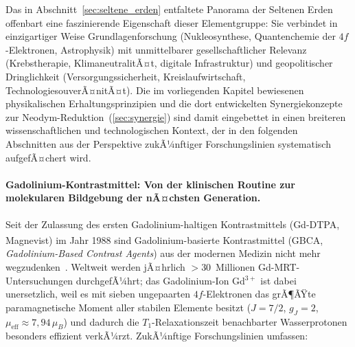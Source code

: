 ﻿\documentclass[12pt, a4paper]{report}
\theoremstyle{definition}
\theoremstyle{remark}
\begin{document}
Das in Abschnitt~\ref{sec:seltene_erden} entfaltete Panorama der Seltenen
Erden offenbart eine faszinierende Eigenschaft dieser Elementgruppe: Sie
verbindet in einzigartiger Weise Grundlagenforschung (Nukleosynthese,
Quantenchemie der $4f$-Elektronen, Astrophysik) mit unmittelbarer gesellschaft\-licher
Relevanz (Krebstherapie, KlimaneutralitÃ¤t, digitale Infrastruktur) und
geopolitischer Dringlichkeit (Versorgungssicherheit, Kreislaufwirtschaft,
TechnologiesouverÃ¤nitÃ¤t). Die im vorliegenden Kapitel bewiesenen
physikalischen Erhaltungsprinzipien und die dort entwickelten
Synergiekonzepte zur Neodym-Reduktion~(\ref{sec:synergie}) sind damit
eingebettet in einen breiteren wissenschaftlichen und technologischen
Kontext, der in den folgenden Abschnitten aus der Perspektive zukÃ¼nftiger
Forschungslinien systematisch aufgefÃ¤chert wird.

\paragraph{Gadolinium-Kontrastmittel: Von der klinischen Routine zur
molekularen Bildgebung der nÃ¤chsten Generation.}
Seit der Zulassung des ersten Gadolinium-haltigen Kontrastmittels
(Gd-DTPA, Magnevist\textsuperscript{\textregistered}) im Jahr 1988 sind
Gadolinium-basierte Kontrastmittel (GBCA, \emph{Gadolinium-Based Contrast
Agents}) aus der modernen Medizin nicht mehr wegzudenken~\cite{caravan1999}.
Weltweit werden jÃ¤hrlich $>30$~Millionen Gd-MRT-Untersuchungen durchgefÃ¼hrt;
das Gadolinium-Ion Gd$^{3+}$ ist dabei unersetzlich, weil es mit sieben
ungepaarten $4f$-Elektronen das grÃ¶ÃŸte paramagnetische Moment aller stabilen
Elemente besitzt ($J = 7/2$, $g_J = 2$, $\mu_{\mathrm{eff}} \approx 7{,}94\,\mu_B$)
und dadurch die $T_1$-Relaxationszeit benachbarter Wasserprotonen besonders
effizient verkÃ¼rzt. ZukÃ¼nftige Forschungslinien umfassen:
\end{document}
